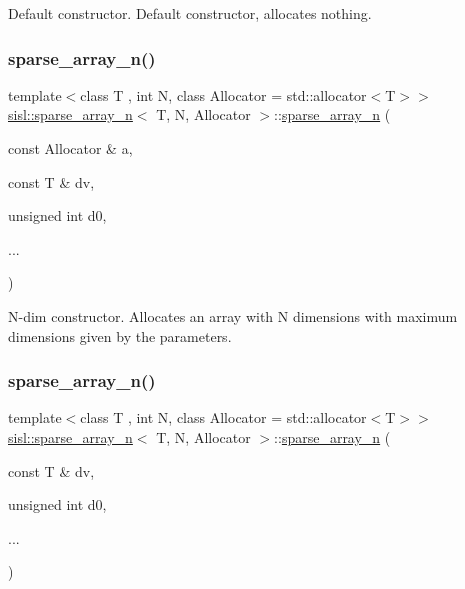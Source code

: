 Default constructor. Default constructor, allocates nothing. \mbox{\label{classsisl_1_1sparse__array__n_afd76d3fbb0e923e2b28cfba1c675482b}} 
\subsubsection{\texorpdfstring{sparse\+\_\+array\+\_\+n()}{sparse\_array\_n()}\hspace{0.1cm}{\footnotesize\ttfamily [2/3]}}
{\footnotesize\ttfamily template$<$class T , int N, class Allocator  = std\+::allocator$<$\+T$>$$>$ \\
\hyperlink{classsisl_1_1sparse__array__n}{sisl\+::sparse\+\_\+array\+\_\+n}$<$ T, N, Allocator $>$\+::\hyperlink{classsisl_1_1sparse__array__n}{sparse\+\_\+array\+\_\+n} (\begin{DoxyParamCaption}\item[{const Allocator \&}]{a,  }\item[{const T \&}]{dv,  }\item[{unsigned int}]{d0,  }\item[{}]{... }\end{DoxyParamCaption})\hspace{0.3cm}{\ttfamily [inline]}}

N-\/dim constructor. Allocates an array with N dimensions with maximum dimensions given by the parameters. \mbox{\label{classsisl_1_1sparse__array__n_a3132fb2f99e33ea6c34129eb1a02523f}} 
\subsubsection{\texorpdfstring{sparse\+\_\+array\+\_\+n()}{sparse\_array\_n()}\hspace{0.1cm}{\footnotesize\ttfamily [3/3]}}
{\footnotesize\ttfamily template$<$class T , int N, class Allocator  = std\+::allocator$<$\+T$>$$>$ \\
\hyperlink{classsisl_1_1sparse__array__n}{sisl\+::sparse\+\_\+array\+\_\+n}$<$ T, N, Allocator $>$\+::\hyperlink{classsisl_1_1sparse__array__n}{sparse\+\_\+array\+\_\+n} (\begin{DoxyParamCaption}\item[{const T \&}]{dv,  }\item[{unsigned int}]{d0,  }\item[{}]{... }\end{DoxyParamCaption})\hspace{0.3cm}{\ttfamily [inline]}}

